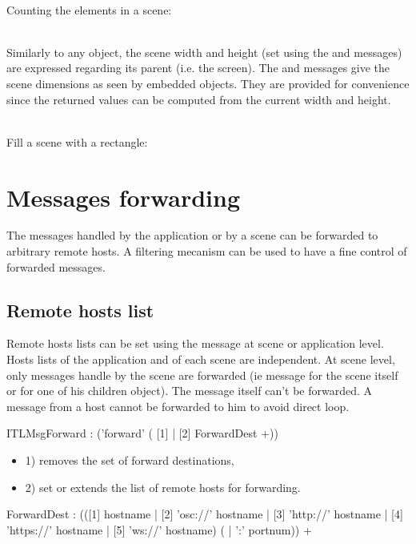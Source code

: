 \documentclass[a4paper,twoside]{report}
\newcommand{\toplevel}[1]	{\chapter{#1}}
\newcommand{\sublevel}[1]	{\section{#1}}
\begin{document}
\example \\
Counting the elements in a scene:

 \\
Similarly to any object, the scene width and height (set using the  and  messages) are expressed regarding its parent (i.e. the screen). The  and  messages give the scene dimensions as seen by embedded objects. They are provided for convenience since the returned values can be computed from the current width and height.

\example \\
Fill a scene with a rectangle:

\toplevel{Messages forwarding}
\label{Forwarding}
The messages handled by the application or by a scene can be forwarded to arbitrary remote hosts. A filtering mecanism can be used to have a fine control of forwarded messages.

\sublevel{Remote hosts list}
\label{RemoteHosts}

Remote hosts lists can be set using the  message at scene or application level. Hosts lists of the application and of each scene are independent.
At scene level, only messages handle by the scene are forwarded (ie message for the scene itself or for one of his children object).
The  message itself can't be forwarded. 
A message from a host cannot be forwarded to him to avoid direct loop.
 

\begin{rail}
ITLMsgForward : ('forward' ( [1] | [2] ForwardDest +))
\end{rail}
\begin{itemize}
\item 1) removes the set of forward destinations,
\item 2) set or extends the list of remote hosts for forwarding. 
\end{itemize}

\begin{rail}
ForwardDest : (([1] hostname | [2] 'osc://' hostname | [3] 'http://' hostname  | [4] 'https://' hostname |  [5] 'ws://' hostname) ( | ':' portnum)) +
\end{rail}
\end{document}
